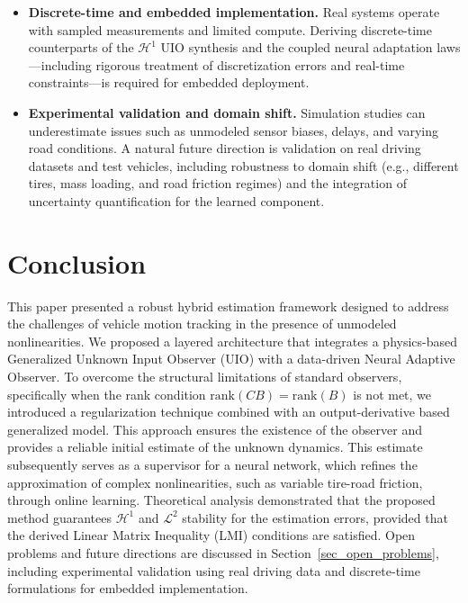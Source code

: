 \begin{itemize}
    \item \textbf{Discrete-time and embedded implementation.} Real systems operate with sampled measurements and limited compute. Deriving discrete-time counterparts of the $\mathcal{H}^{1}$ UIO synthesis and the coupled neural adaptation laws---including rigorous treatment of discretization errors and real-time constraints---is required for embedded deployment.

    \item \textbf{Experimental validation and domain shift.} Simulation studies can underestimate issues such as unmodeled sensor biases, delays, and varying road conditions. A natural future direction is validation on real driving datasets and test vehicles, including robustness to domain shift (e.g., different tires, mass loading, and road friction regimes) and the integration of uncertainty quantification for the learned component.
\end{itemize}

\section{Conclusion}\label{sec7}
This paper presented a robust hybrid estimation framework designed to address the challenges of vehicle motion tracking in the presence of unmodeled nonlinearities. We proposed a layered architecture that integrates a physics-based Generalized Unknown Input Observer (UIO) with a data-driven Neural Adaptive Observer. To overcome the structural limitations of standard observers, specifically when the rank condition $\mathrm{rank}(CB) = \mathrm{rank}(B)$ is not met, we introduced a regularization technique combined with an output-derivative based generalized model. This approach ensures the existence of the observer and provides a reliable initial estimate of the unknown dynamics. This estimate subsequently serves as a supervisor for a neural network, which refines the approximation of complex nonlinearities, such as variable tire-road friction, through online learning. Theoretical analysis demonstrated that the proposed method guarantees $\mathcal{H}^1$ and $\mathcal{L}^2$ stability for the estimation errors, provided that the derived Linear Matrix Inequality (LMI) conditions are satisfied. Open problems and future directions are discussed in Section~\ref{sec_open_problems}, including experimental validation using real driving data and discrete-time formulations for embedded implementation.
